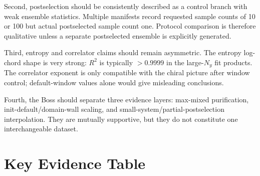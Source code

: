 \documentclass[aps,prb,onecolumn,nofootinbib,superscriptaddress]{revtex4-2}
\newcommand{\Ny}{N_y}
\begin{document}
Second, postselection should be consistently described as a control branch with weak ensemble statistics.  Multiple manifests record requested sample counts of 10 or 100 but actual postselected sample count one.  Protocol comparison is therefore qualitative unless a separate postselected ensemble is explicitly generated.

Third, entropy and correlator claims should remain asymmetric.  The entropy log-chord shape is very strong: $R^2$ is typically $>0.9999$ in the large-$\Ny$ fit products.  The correlator exponent is only compatible with the chiral picture after window control; default-window values alone would give misleading conclusions.

Fourth, the Boss should separate three evidence layers: max-mixed purification, init-default/domain-wall scaling, and small-system/partial-postselection interpolation.  They are mutually supportive, but they do not constitute one interchangeable dataset.

\section{Key Evidence Table}
\end{document}
